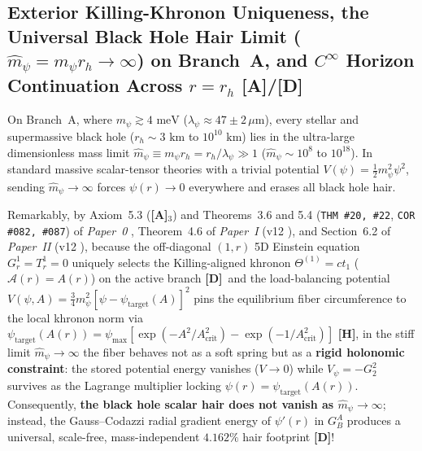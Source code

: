 \documentclass[11pt,a4paper]{article}
\newcommand{\catA}{\textbf{\textcolor{purple!80!black}{[A]}}}
\newcommand{\catD}{\textbf{\textcolor{blue!75!black}{[D]}}}
\newcommand{\catH}{\textbf{\textcolor{orange!85!black}{[H]}}}
\theoremstyle{plain}
\theoremstyle{definition}
\theoremstyle{remark}
\numberwithin{equation}{section}
\begin{document}
\subsection{\texorpdfstring{Exterior Killing-Khronon Uniqueness, the Universal Black Hole Hair Limit ($\hat{m}_{\psi} = m_{\psi}r_h \to \infty$) on Branch~A, and $C^{\infty}$ Horizon Continuation Across $r = r_h$ \catA/\catD}{Exterior Killing-Khronon Uniqueness, the Universal Black Hole Hair Limit (m_hat -> infinity) on Branch A, and C^infty Horizon Continuation [A]/[D]}}

On Branch~A, where $m_{\psi} \gtrsim 4\text{ meV}$ ($\lambda_{\psi} \approx 47 \pm 2\,\mu\text{m}$), every stellar and supermassive black hole ($r_h \sim 3\text{ km}$ to $10^{10}\text{ km}$) lies in the ultra-large dimensionless mass limit $\hat{m}_{\psi} \equiv m_{\psi}r_h = r_h/\lambda_{\psi} \gg 1$ ($\hat{m}_{\psi} \sim 10^{8}$ to $10^{18}$). In standard massive scalar-tensor theories with a trivial potential $V(\psi) = \frac{1}{2}m_{\psi}^2\psi^2$, sending $\hat{m}_{\psi} \to \infty$ forces $\psi(r) \to 0$ everywhere and erases all black hole hair.

Remarkably, by Axiom~5.3 (\catA$_3$) and Theorems~3.6 and 5.4 (\texttt{THM \#20, \#22}, \texttt{COR \#082, \#087}) of \textit{Paper~0} \cite{jimenez2026_p0}, Theorem~4.6 of \textit{Paper~I} (v12 \cite{jimenez2026a}), and Section~6.2 of \textit{Paper~II} (v12 \cite{jimenez2026b}), because the off-diagonal $(1,r)$ 5D Einstein equation $G^1_r = T^1_r = 0$ uniquely selects the Killing-aligned khronon $\Theta^{(1)} = ct_1$ ($\mathcal{A}(r) = A(r)$) on the active branch \catD\ and the load-balancing potential $V(\psi, A) = \frac{3}{4}m_{\psi}^2[\psi - \psi_{\text{target}}(A)]^2$ pins the equilibrium fiber circumference to the local khronon norm via $\psi_{\text{target}}(A(r)) = \psi_{\max}[\exp(-A^2/A_{\text{crit}}^2) - \exp(-1/A_{\text{crit}}^2)]$ \catH, in the stiff limit $\hat{m}_{\psi} \to \infty$ the fiber behaves not as a soft spring but as a \textbf{rigid holonomic constraint}: the stored potential energy vanishes ($V \to 0$) while $V_{\psi} = -G^2_2$ survives as the Lagrange multiplier locking $\psi(r) = \psi_{\text{target}}(A(r))$. Consequently, \textbf{the black hole scalar hair does not vanish as $\hat{m}_{\psi} \to \infty$}; instead, the Gauss--Codazzi radial gradient energy of $\psi'(r)$ in $G^A_B$ produces a universal, scale-free, mass-independent $4.162\%$ hair footprint \catD!
\end{document}
